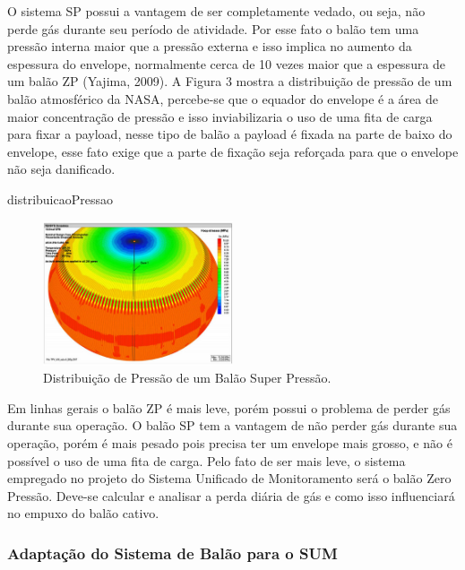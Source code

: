 	O sistema SP possui a vantagem de ser completamente vedado, ou seja, não perde gás durante seu período de atividade. Por esse fato o balão tem uma pressão interna maior que a pressão externa e isso implica no aumento da espessura do envelope, normalmente cerca de 10 vezes maior que a espessura de um balão ZP (Yajima, 2009). A Figura 3 mostra a distribuição de pressão de um balão atmosférico da NASA, percebe-se que o equador do envelope é a área de maior concentração de pressão e isso inviabilizaria o uso de uma fita de carga para fixar a payload, nesse tipo de balão a payload é fixada na parte de baixo do envelope, esse fato exige que a parte de fixação seja reforçada para que o envelope não seja danificado.

	distribuicaoPressao

	\begin{figure}[H]
		\centering
		\includegraphics[width=0.5\textwidth]{figuras/distribuicaoPressao}
		\caption{Distribuição de Pressão de um Balão Super Pressão.}
		\label{img:distribuicaoPressao}
	\end{figure}

	Em linhas gerais o balão ZP é mais leve, porém possui o problema de perder gás durante sua operação. O balão SP tem a vantagem de não perder gás durante sua operação, porém é mais pesado pois precisa ter um envelope mais grosso, e não é possível o uso de uma fita de carga. Pelo fato de ser mais leve, o sistema empregado no projeto do Sistema Unificado de Monitoramento será o balão Zero Pressão. Deve-se calcular e analisar a perda diária de gás e como isso influenciará no empuxo do balão cativo.

	\subsubsection{Adaptação do Sistema de Balão para o SUM}

